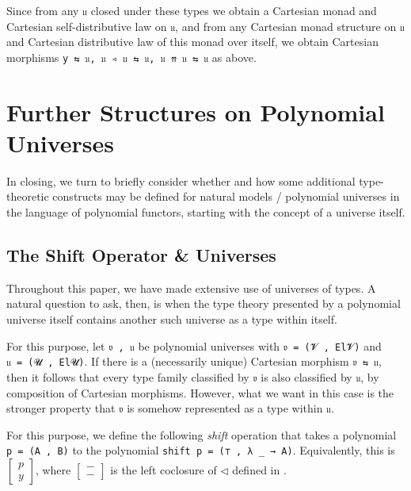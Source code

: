 \documentclass[
  11pt,
  oneside,
  article]{memoir}
\theoremstyle{definition}
\theoremstyle{plain}
\newcommand{\0}{\textsf{0}}
\newcommand{\1}{\tn{\textsf{1}}}
\begin{document}
Since from any \texttt{𝔲} closed under these types we obtain a Cartesian
monad and Cartesian self-distributive law on \texttt{𝔲}, and from any
Cartesian monad structure on \texttt{𝔲} and Cartesian distributive law
of this monad over itself, we obtain Cartesian morphisms
\texttt{y\ ⇆\ 𝔲,\ 𝔲\ ◃\ 𝔲\ ⇆\ 𝔲,\ 𝔲\ ⇈\ 𝔲\ ⇆\ 𝔲} as above.

\chapter{Further Structures on Polynomial
Universes}\label{further-structures-on-polynomial-universes}

In closing, we turn to briefly consider whether and how some additional
type-theoretic constructs may be defined for natural models / polynomial
universes in the language of polynomial functors, starting with the
concept of a universe itself.

\section{The Shift Operator \&
Universes}\label{the-shift-operator-universes}

Throughout this paper, we have made extensive use of universes of types.
A natural question to ask, then, is when the type theory presented by a
polynomial universe itself contains another such universe as a type
within itself.

For this purpose, let \texttt{𝔳\ ,\ 𝔲} be polynomial universes with
\texttt{𝔳\ =\ (𝓥\ ,\ El𝓥)} and \texttt{𝔲\ =\ (𝓤\ ,\ El𝓤)}. If there is a
(necessarily unique) Cartesian morphism \texttt{𝔳\ ⇆\ 𝔲}, then it
follows that every type family classified by \texttt{𝔳} is also
classified by \texttt{𝔲}, by composition of Cartesian morphisms.
However, what we want in this case is the stronger property that
\texttt{𝔳} is somehow represented as a type within \texttt{𝔲}.

For this purpose, we define the following \emph{shift} operation that
takes a polynomial \texttt{p\ =\ (A\ ,\ B)} to the polynomial
\texttt{shift\ p\ =\ (⊤\ ,\ λ\ \_\ →\ A)}. Equivalently, this is
\(\left[ \begin{array}{c} p\\ y \end{array} \right]\), where
\(\left[ \begin{array}{c} -\\ - \end{array} \right]\) is the left
coclosure of \(\triangleleft\) defined in \cite{niu2024polynomial}.
\end{document}
